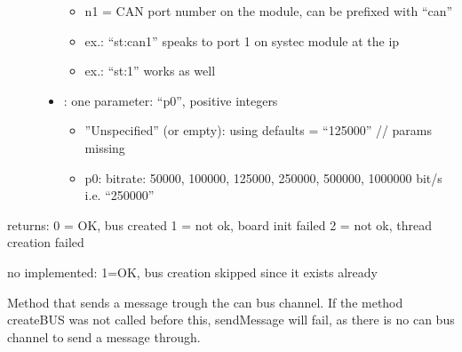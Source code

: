 \documentclass[a4paper,10pt,english]{sphinxmanual}
\begin{document}
\begin{fulllineitems}
\begin{fulllineitems}
\begin{description}
\begin{itemize}
\begin{itemize}
\item {} 
n1 = CAN port number on the module, can be prefixed with “can”

\item {} 
ex.: “st:can1” speaks to port 1 on systec module at the ip

\item {} 
ex.: “st:1” works as well

\end{itemize}


\item {} 
: one parameter: “p0”, positive integers\begin{itemize}
\item {} 
”Unspecified” (or empty): using defaults = “125000” // params missing

\item {} 
p0: bitrate: 50000, 100000, 125000, 250000, 500000, 1000000 bit/s i.e. “250000”

\end{itemize}


\end{itemize}

\end{description}


returns: 0 = OK, bus created \sphinxhyphen{}1 = not ok, board init failed \sphinxhyphen{}2 = not ok, thread creation failed

no implemented: 1=OK, bus creation skipped since it exists already 

\end{fulllineitems}


\begin{fulllineitems}
\label{\detokenize{vendors/systec:_CPPv4N9STCanScan11sendMessageEshPhb}}%
\pysigstartmultiline
{}%
\pysigstopmultiline
Method that sends a message trough the can bus channel. If the method createBUS was not called before this, sendMessage will fail, as there is no can bus channel to send a message through.


\end{fulllineitems}
\end{fulllineitems}
\end{document}
